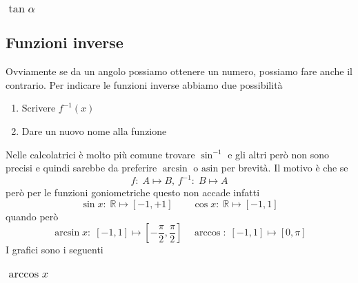 \subsubsection{$\tan\alpha$}
\begin{center}
\end{center}

\subsection{Funzioni inverse}
Ovviamente se da un angolo possiamo ottenere un numero, possiamo fare anche il contrario. Per indicare
le funzioni inverse abbiamo due possibilità
\begin{enumerate}
	\item Scrivere $f^{-1}(x)$
	\item Dare un nuovo nome alla funzione
\end{enumerate}

Nelle calcolatrici è molto più comune trovare $\sin^{-1}$ e gli altri però non sono precisi e quindi
sarebbe da preferire $\arcsin$ o $\mathrm{asin}$ per brevità. Il motivo è che se
\begin{equation*}
f:\;A\mapsto B,\,f^{-1}:\;B\mapsto A
\end{equation*}
però per le funzioni goniometriche questo non accade infatti
\begin{equation*}
\sin x:\;\mathbb{R}\mapsto{[{-1},{+1}]} \qquad \cos x:\;\mathbb{R}\mapsto{[{-1},{1}]}
\end{equation*}
quando però
\begin{equation*}
\arcsin x:\;{[{-1},{1}]}\mapsto{[{-\frac{\pi}{2}},{\frac{\pi}{2}}]} \quad 
\arccos:\;{[{-1},{1}]}\mapsto{[0,{\pi}]}
\end{equation*}
I grafici sono i seguenti
\subsubsection{$\arccos x$}
\begin{center}
\end{center}
